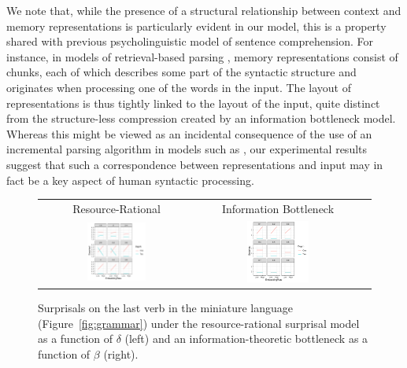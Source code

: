We note that, while the presence of a structural relationship between context and memory representations is particularly evident in our model, this is a property shared with previous psycholinguistic model of sentence comprehension.
For instance, in models of retrieval-based parsing \citep{lewis2005activation}, memory representations consist of chunks, each of which describes some part of the syntactic structure and originates when processing one of the words in the input. The layout of representations is thus tightly linked to the layout of the input, quite distinct from the structure-less compression created by an information bottleneck model.
Whereas this might be viewed as an incidental consequence of the use of an incremental parsing algorithm in models such as \citet{lewis2005activation}, our experimental results suggest that such a correspondence between representations and input may in fact be a key aspect of human syntactic processing.



\begin{figure}
    \centering
    \begin{tabular}{ccl}
    Resource-Rational  & Information Bottleneck \\
    \includegraphics[width=0.4\textwidth]{figures/resource-rational_Integer.pdf} &
    \includegraphics[width=0.4\textwidth]{figures/bottleneck.pdf}
    \end{tabular}
    \caption{Surprisals on the last verb in the miniature language (Figure~\ref{fig:grammar}) under the resource-rational surprisal model as a function of $\delta$ (left) and an information-theoretic bottleneck as a function of $\beta$ (right).}
    \label{fig:bottleneck}
\end{figure}


